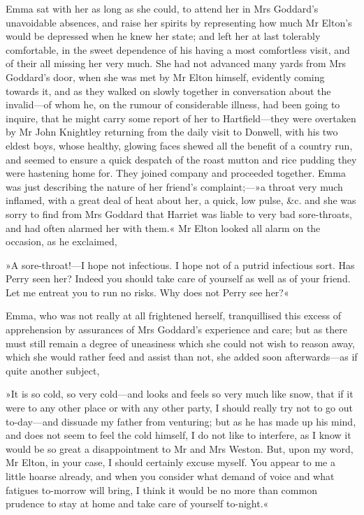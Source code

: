 Emma sat with her as long as she could, to attend her in Mrs Goddard's unavoidable absences, and raise her spirits by representing how much Mr Elton's would be depressed when he knew her state; and left her at last tolerably comfortable, in the sweet dependence of his having a most comfortless visit, and of their all missing her very much. She had not advanced many yards from Mrs Goddard's door, when she was met by Mr Elton himself, evidently coming towards it, and as they walked on slowly together in conversation about the invalid—of whom he, on the rumour of considerable illness, had been going to inquire, that he might carry some report of her to Hartfield—they were overtaken by Mr John Knightley returning from the daily visit to Donwell, with his two eldest boys, whose healthy, glowing faces shewed all the benefit of a country run, and seemed to ensure a quick despatch of the roast mutton and rice pudding they were hastening home for. They joined company and proceeded together. Emma was just describing the nature of her friend's complaint;—»a throat very much inflamed, with a great deal of heat about her, a quick, low pulse, \&c. and she was sorry to find from Mrs Goddard that Harriet was liable to very bad sore-throats, and had often alarmed her with them.« Mr Elton looked all alarm on the occasion, as he exclaimed,

»A sore-throat!—I hope not infectious. I hope not of a putrid infectious sort. Has Perry seen her? Indeed you should take care of yourself as well as of your friend. Let me entreat you to run no risks. Why does not Perry see her?«

Emma, who was not really at all frightened herself, tranquillised this excess of apprehension by assurances of Mrs Goddard's experience and care; but as there must still remain a degree of uneasiness which she could not wish to reason away, which she would rather feed and assist than not, she added soon afterwards—as if quite another subject,

»It is so cold, so very cold—and looks and feels so very much like snow, that if it were to any other place or with any other party, I should really try not to go out to-day—and dissuade my father from venturing; but as he has made up his mind, and does not seem to feel the cold himself, I do not like to interfere, as I know it would be so great a disappointment to Mr and Mrs Weston. But, upon my word, Mr Elton, in your case, I should certainly excuse myself. You appear to me a little hoarse already, and when you consider what demand of voice and what fatigues to-morrow will bring, I think it would be no more than common prudence to stay at home and take care of yourself to-night.«

